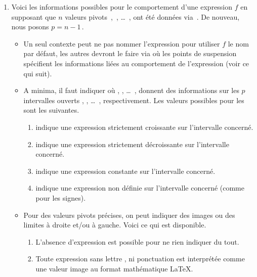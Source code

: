 \documentclass{tutodoc}
\begin{document}
\begin{enumerate}
    \item Voici les informations possibles pour le comportement d'une expression $f$ en supposant que $n$ valeurs pivots \,, \,, \dots\ ,  ont été données via \,. De nouveau, nous posons $p = n - 1$\,.
    \begin{itemize}
	    \item Un seul contexte  peut ne pas nommer l'expression pour utiliser $f$ le nom par défaut, les autres devront le faire via  où les points de suspension spécifient les informations liées au comportement de l'expression (voir ce qui suit).


        \item A minima, il faut indiquer
        où
         ,  , \dots\ , 
        donnent des informations sur les $p$ intervalles ouverts
        \tdoclatexin{]x1 ; x2[} , \tdoclatexin{]x2 ; x3[} , \dots\ , \tdoclatexin{]xp ; xn[} respectivement.
        Les valeurs possibles pour les  sont les suivantes.
        \begin{enumerate}
            \item \tdoclatexin{<} indique une expression strictement croissante sur l'intervalle concerné.

            \item \tdoclatexin{>} indique une expression strictement décroissante sur l'intervalle concerné.

            \item \tdoclatexin{=} indique une expression constante sur l'intervalle concerné.

            \item {} indique une expression non définie sur l'intervalle concerné (comme pour les signes).
        \end{enumerate}


        \item Pour des valeurs pivots précises, on peut indiquer des images ou des limites à droite et/ou à gauche. Voici ce qui est disponible.
        \begin{enumerate}
            \item L'absence d'expression est possible pour ne rien indiquer du tout.

            \item Toute expression sans lettre , ni ponctuation \tdoclatexin{!} est interprétée comme une valeur image au format mathématique \LaTeX.


\end{enumerate}
\end{itemize}
\end{enumerate}
\end{document}
